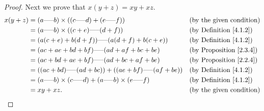 \begin{proof}
    Next we prove that \(x(y + z) = xy + xz\).
    \begin{align*}
        x(y + z) & = (a \text{-----} b) \times ((c \text{-----} d) + (e \text{-----} f))                         &  & \text{(by the given condition)}     \\
                 & = (a \text{-----} b) \times ((c + e) \text{-----} (d + f))                                    &  & \text{(by Definition \ref{4.1.2})}  \\
                 & = (a(c + e) + b(d + f)) \text{-----} (a(d + f) + b(c + e))                                    &  & \text{(by Definition \ref{4.1.2})}  \\
                 & = (ac + ae + bd + bf) \text{-----} (ad + af + bc + be)                                        &  & \text{(by Proposition \ref{2.3.4})} \\
                 & = (ac + bd + ae + bf) \text{-----} (ad + bc + af + be)                                        &  & \text{(by Proposition \ref{2.2.4})} \\
                 & = ((ac + bd) \text{-----} (ad + bc)) + ((ae + bf) \text{-----} (af + be))                     &  & \text{(by Definition \ref{4.1.2})}  \\
                 & = (a \text{-----} b) \times (c \text{-----} d) + (a \text{-----} b) \times (e \text{-----} f) &  & \text{(by Definition \ref{4.1.2})}  \\
                 & = xy + xz.                                                                                    &  & \text{(by the given condition)}
    \end{align*}


\end{proof}
